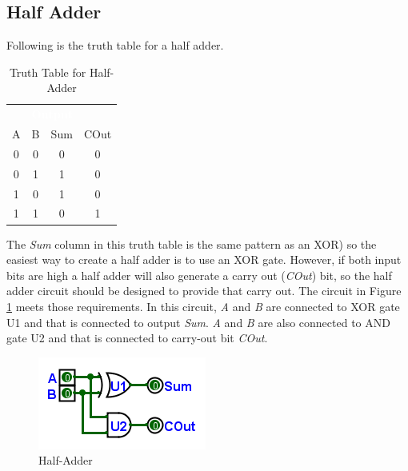 \subsection{Half Adder}
\label{CL:subsec:half_adder}

Following is the truth table for a half adder.

\begin{table}[H]
  \sffamily
  \newcommand{\head}[1]{\textcolor{white}{\textbf{#1}}}    
  \begin{center}
    \begin{tabular}{cc|cc} 
      \rowcolor{black!75}
      \multicolumn{2}{c}{\head{Inputs}} & \multicolumn{2}{c}{\head{Output}} \\
      A & B & Sum & COut \\
      \hline
      0 & 0 & 0 & 0 \\
      0 & 1 & 1 & 0 \\
      1 & 0 & 1 & 0 \\
      1 & 1 & 0 & 1 
    \end{tabular}
  \end{center}
  \caption{Truth Table for Half-Adder}
  \label{CL:tab:truth_table_for_half_adder}
\end{table}

The \emph{Sum} column in this truth table is the same pattern as an \textsf{XOR}) so the easiest way to create a half adder is to use an \textsf{XOR} gate. However, if both input bits are high a half adder will also generate a carry out (\emph{COut}) bit, so the half adder circuit should be designed to provide that carry out. The circuit in Figure \ref{fig:08_05} meets those requirements. In this circuit, \emph{A} and \emph{B} are connected to \textsf{XOR} gate \textsf{U1} and that is connected to output \emph{Sum}. \emph{A} and \emph{B} are also connected to \textsf{AND} gate \textsf{U2} and that is connected to carry-out bit \emph{COut}.

\begin{figure}[H]
	\centering
	\includegraphics[width=\maxwidth{.95\linewidth}]{gfx/08_05}
	\caption{Half-Adder}
	\label{fig:08_05}
\end{figure}

